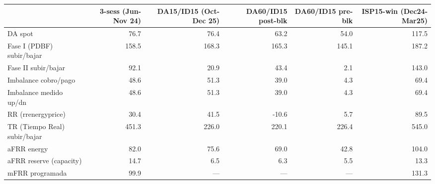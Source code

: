 \begin{tabular}{lrrrrr}
\toprule
 & 3-sess (Jun-Nov 24) & DA15/ID15 (Oct-Dec 25) & DA60/ID15 post-blk & DA60/ID15 pre-blk & ISP15-win (Dec24-Mar25) \\
\midrule
DA spot & 76.7 & 76.4 & 63.2 & 54.0 & 117.5 \\
Fase I (PDBF) subir/bajar & 158.5 & 168.3 & 165.3 & 145.1 & 187.2 \\
Fase II subir/bajar & 92.1 & 20.9 & 43.4 & 2.1 & 143.0 \\
Imbalance cobro/pago & 48.6 & 51.3 & 39.0 & 4.3 & 69.4 \\
Imbalance medido up/dn & 48.6 & 51.3 & 39.0 & 4.3 & 69.4 \\
RR (rrenergyprice) & 30.4 & 41.5 & -10.6 & 5.7 & 89.5 \\
TR (Tiempo Real) subir/bajar & 451.3 & 226.0 & 220.1 & 226.4 & 545.0 \\
aFRR energy & 82.0 & 75.6 & 69.0 & 42.8 & 104.0 \\
aFRR reserve (capacity) & 14.7 & 6.5 & 6.3 & 5.5 & 13.3 \\
mFRR programada & 99.9 & --- & --- & --- & 131.3 \\
\bottomrule
\end{tabular}
